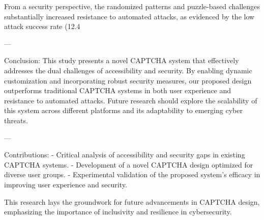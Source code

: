 From a security perspective, the randomized patterns and puzzle-based challenges substantially increased resistance to automated attacks, as evidenced by the low attack success rate (12.4%

---

Conclusion:  
This study presents a novel CAPTCHA system that effectively addresses the dual challenges of accessibility and security. By enabling dynamic customization and incorporating robust security measures, our proposed design outperforms traditional CAPTCHA systems in both user experience and resistance to automated attacks. Future research should explore the scalability of this system across different platforms and its adaptability to emerging cyber threats.  

---

Contributions:  
- Critical analysis of accessibility and security gaps in existing CAPTCHA systems.  
- Development of a novel CAPTCHA design optimized for diverse user groups.  
- Experimental validation of the proposed system's efficacy in improving user experience and security.  

This research lays the groundwork for future advancements in CAPTCHA design, emphasizing the importance of inclusivity and resilience in cybersecurity.  
